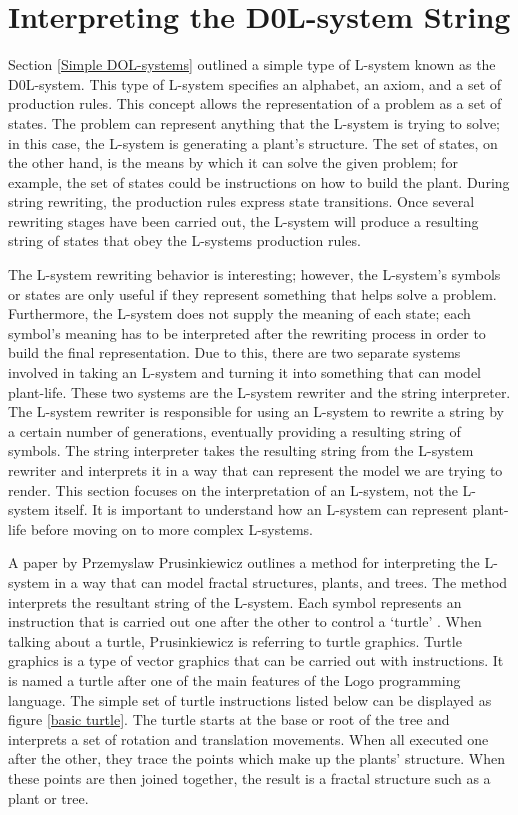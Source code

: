 \section{Interpreting the D0L-system String} \label{Interpreting DOL-system}

Section \ref{Simple DOL-systems} outlined a simple type of L-system known as the D0L-system. This type of L-system specifies an alphabet, an axiom, and a set of production rules. This concept allows the representation of a problem as a set of states. The problem can represent anything that the L-system is trying to solve; in this case, the L-system is generating a plant's structure. The set of states, on the other hand, is the means by which it can solve the given problem; for example, the set of states could be instructions on how to build the plant. During string rewriting, the production rules express state transitions. Once several rewriting stages have been carried out, the L-system will produce a resulting string of states that obey the L-systems production rules. 

\newpage

The L-system rewriting behavior is interesting; however, the L-system's symbols or states are only useful if they represent something that helps solve a problem. Furthermore, the L-system does not supply the meaning of each state; each symbol's meaning has to be interpreted after the rewriting process in order to build the final representation. Due to this, there are two separate systems involved in taking an L-system and turning it into something that can model plant-life. These two systems are the L-system rewriter and the string interpreter. The L-system rewriter is responsible for using an L-system to rewrite a string by a certain number of generations, eventually providing a resulting string of symbols. The string interpreter takes the resulting string from the L-system rewriter and interprets it in a way that can represent the model we are trying to render. This section focuses on the interpretation of an L-system, not the L-system itself. It is important to understand how an L-system can represent plant-life before moving on to more complex L-systems.

A paper by Przemyslaw Prusinkiewicz outlines a method for interpreting the L-system in a way that can model fractal structures, plants, and trees. The method interprets the resultant string of the L-system. Each symbol represents an instruction that is carried out one after the other to control a `turtle' \cite{prusinkiewicz1986graphical}. When talking about a turtle, Prusinkiewicz is referring to turtle graphics. Turtle graphics is a type of vector graphics that can be carried out with instructions. It is named a turtle after one of the main features of the Logo programming language. The simple set of turtle instructions listed below can be displayed as figure \ref{basic turtle}. The turtle starts at the base or root of the tree and interprets a set of rotation and translation movements. When all executed one after the other, they trace the points which make up the plants' structure. When these points are then joined together, the result is a fractal structure such as a plant or tree.


